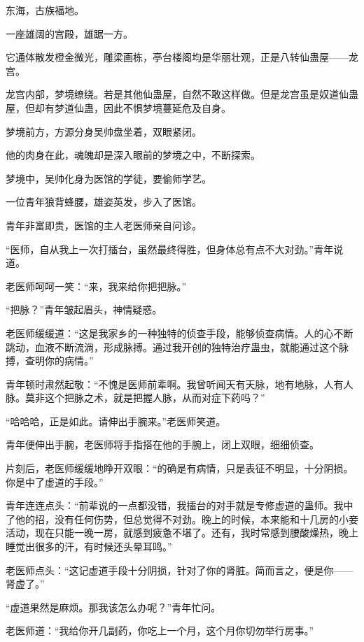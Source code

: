 
\begin{this_body}

东海，古族福地。

一座雄阔的宫殿，雄踞一方。

它通体散发橙金微光，雕梁画栋，亭台楼阁均是华丽壮观，正是八转仙蛊屋——龙宫。

龙宫内部，梦境缭绕。若是其他仙蛊屋，自然不敢这样做。但是龙宫虽是奴道仙蛊屋，但却有梦道仙蛊，因此不惧梦境蔓延危及自身。

梦境前方，方源分身吴帅盘坐着，双眼紧闭。

他的肉身在此，魂魄却是深入眼前的梦境之中，不断探索。

梦境中，吴帅化身为医馆的学徒，要偷师学艺。

一位青年狼背蜂腰，雄姿英发，步入了医馆。

青年非富即贵，医馆的主人老医师亲自问诊。

“医师，自从我上一次打擂台，虽然最终得胜，但身体总有点不大对劲。”青年说道。

老医师呵呵一笑：“来，我来给你把把脉。”

“把脉？”青年皱起眉头，神情疑惑。

老医师缓缓道：“这是我家乡的一种独特的侦查手段，能够侦查病情。人的心不断跳动，血液不断流淌，形成脉搏。通过我开创的独特治疗蛊虫，就能通过这个脉搏，查明你的病情。”

青年顿时肃然起敬：“不愧是医师前辈啊。我曾听闻天有天脉，地有地脉，人有人脉。莫非这个把脉之术，就是把握人脉，从而对症下药吗？”

“哈哈哈，正是如此。请伸出手腕来。”老医师笑道。

青年便伸出手腕，老医师将手指搭在他的手腕上，闭上双眼，细细侦查。

片刻后，老医师缓缓地睁开双眼：“的确是有病情，只是表征不明显，十分阴损。你是中了虚道的手段。”

青年连连点头：“前辈说的一点都没错，我擂台的对手就是专修虚道的蛊师。我中了他的招，没有任何伤势，但总觉得不对劲。晚上的时候，本来能和十几房的小妾活动，现在只能一晚一房，就感到疲惫不堪了。还有，我时常感到腰酸燥热，晚上睡觉出很多的汗，有时候还头晕耳鸣。”

老医师点头：“这记虚道手段十分阴损，针对了你的肾脏。简而言之，便是你——肾虚了。”

“虚道果然是麻烦。那我该怎么办呢？”青年忙问。

老医师道：“我给你开几副药，你吃上一个月，这个月你切勿举行房事。”


\end{this_body}

